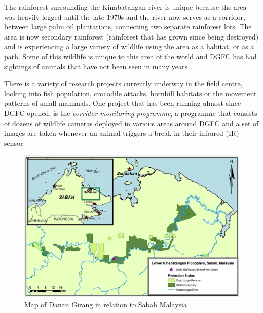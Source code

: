 The rainforest surrounding the Kinabatangan river is unique because the area was heavily logged until the late 1970s and the river now serves as a corridor, between large palm oil plantations, connecting two separate rainforest lots. The area is now secondary rainforest (rainforest that has grown since being destroyed) and is experiencing a large variety of wildlife using the area as a habitat, or as a path. Some of this wildlife is unique to this area of the world and DGFC has had sightings of animals that have not been seen in many years \cite{Goossens2012}.

There is a variety of research projects currently underway in the field centre, looking into fish population, crocodile attacks, hornbill habitats or the movement patterns of small mammals. One project that has been running almost since DGFC opened, is the \textit{corridor monitoring programme}, a programme that consists of dozens of wildlife cameras deployed in various areas around DGFC and a set of images are taken whenever an animal triggers a break in their infrared (IR)  sensor.

\begin{figure}[h]
\centering
\includegraphics[width=\textwidth]{Chap3/figures/dgfc_map}
\caption{Map of Danau Girang in relation to Sabah Malaysia}
\label{int:fig:map}
\end{figure}

